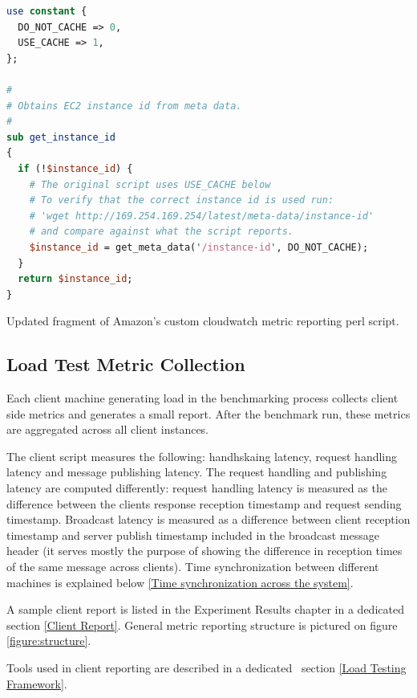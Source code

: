 \documentclass{uvamscse}
\begin{document}
\begin{sourcecode}
\begin{lstlisting}[style=mono, language=perl]
use constant {
  DO_NOT_CACHE => 0,
  USE_CACHE => 1,
};

#
# Obtains EC2 instance id from meta data.
#
sub get_instance_id
{
  if (!$instance_id) {
    # The original script uses USE_CACHE below
    # To verify that the correct instance id is used run:
    # 'wget http://169.254.169.254/latest/meta-data/instance-id'
    # and compare against what the script reports.
    $instance_id = get_meta_data('/instance-id', DO_NOT_CACHE);
  }
  return $instance_id;
}
\end{lstlisting}
\caption{Updated fragment of Amazon's custom cloudwatch metric reporting perl script.}
\label{lstlisting:perl}
\end{sourcecode}

\subsection{Load Test Metric Collection}

Each client machine generating load in the benchmarking process collects client side metrics and generates a small report. After the benchmark run, these metrics are aggregated across all client instances.

The client script measures the following: handhskaing latency, request handling latency and message publishing latency. The request handling and publishing latency are computed differently: request handling latency is measured as the difference between the clients response reception timestamp and request sending timestamp. Broadcast latency is measured as a difference between client reception timestamp and server publish timestamp included in the broadcast message header (it serves mostly the purpose of showing the difference in reception times of the same message across clients). Time synchronization between different machines is explained below \ref{Time synchronization across the system}.

A sample client report is listed in the Experiment Results chapter in a dedicated section \ref{Client Report}. General metric reporting structure is pictured on figure \ref{figure:structure}.

Tools used in client reporting are described in a dedicated  section \ref{Load Testing Framework}.
\end{document}
